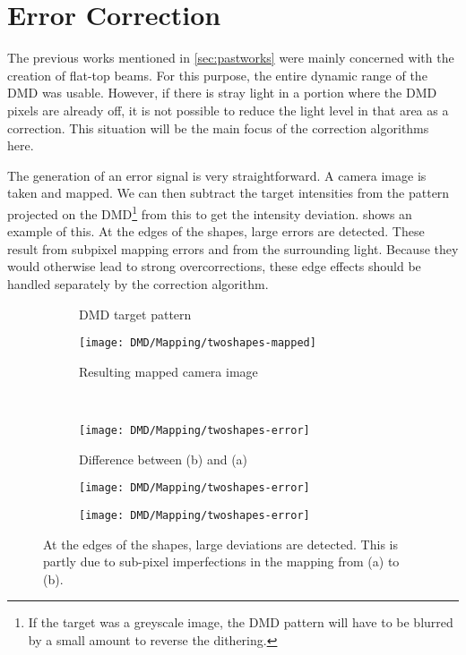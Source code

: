 \section{Error Correction}
The previous works mentioned in \cref{sec:pastworks} were mainly concerned with the creation of flat-top beams. For this purpose, the entire dynamic range of the DMD was usable. However, if there is stray light in a portion where the DMD pixels are already off, it is not possible to reduce the light level in that area as a correction. This situation will be the main focus of the correction algorithms here.

The generation of an error signal is very straightforward. A camera image is taken and mapped. We can then subtract the target intensities from the pattern projected on the DMD\footnote{If the target was a greyscale image, the DMD pattern will have to be blurred by a small amount to reverse the dithering.} from this to get the intensity deviation.  shows an example of this. At the edges of the shapes, large errors are detected. These result from subpixel mapping errors and from the surrounding light. Because they would otherwise lead to strong overcorrections, these edge effects should be handled separately by the correction algorithm.
\begin{figure}[p]
    \centering
    \begin{subfigure}[t]{0.49\textwidth}
        \centering
        \caption{DMD target pattern}
        \label{fig:imaging_error_target}
    \end{subfigure}
    \begin{subfigure}[t]{0.49\textwidth}
        \centering
        \texttt{[image: DMD/Mapping/twoshapes-mapped]}
        \caption{Resulting mapped camera image}
    \end{subfigure} \\[\baselineskip]
    \begin{subfigure}[T]{.49\textwidth}
        \centering
        \texttt{[image: DMD/Mapping/twoshapes-error]}
        \caption{Difference between (b) and (a)}
    \end{subfigure}
    \hspace{-0.7em}
    \begin{subfigure}[T]{.06\textwidth}
        \centering
        \texttt{[image: DMD/Mapping/twoshapes-error]}
    \end{subfigure}
    \hspace{-1.1em}
    \begin{subfigure}[T]{.065\textwidth}
        \centering
        \texttt{[image: DMD/Mapping/twoshapes-error]}
    \end{subfigure}
    \caption[Example of DMD imaging error]{At the edges of the shapes, large deviations are detected. This is partly due to sub-pixel imperfections in the mapping from (a) to (b).}
    \label{fig:imaging_error_example}
\end{figure}

